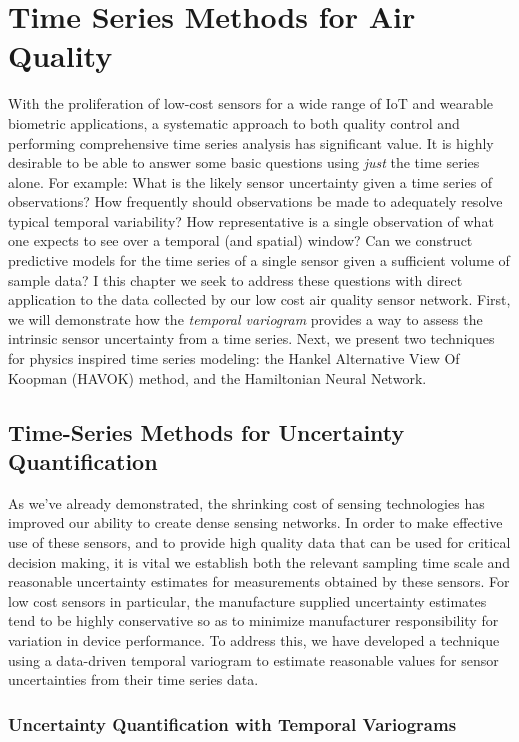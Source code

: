 \chapter{Time Series Methods for Air Quality}

With the proliferation of low-cost sensors for a wide range of IoT and wearable biometric applications, a systematic approach to both quality control and performing comprehensive time series analysis has significant value. It is highly desirable to be able to answer some basic questions using \textit{just} the time series alone. For example: What is the likely sensor uncertainty given a time series of observations? How frequently should observations be made to adequately resolve typical temporal variability? How representative is a single observation of what one expects to see over a temporal (and spatial) window? Can we construct predictive models for the time series of a single sensor given a sufficient volume of sample data? I this chapter we seek to address these questions with direct application to the data collected by our low cost air quality sensor network. First, we will demonstrate how the \textit{temporal variogram} provides a way to assess the intrinsic sensor uncertainty from a time series. Next, we present two techniques for physics inspired time series modeling: the Hankel Alternative View Of Koopman (HAVOK) method, and the Hamiltonian Neural Network.



\section{Time-Series Methods for Uncertainty Quantification}

As we've already demonstrated, the shrinking cost of sensing technologies has improved our ability to create dense sensing networks. In order to make effective use of these sensors, and to provide high quality data that can be used for critical decision making, it is vital we establish both the relevant sampling time scale and reasonable uncertainty estimates for measurements obtained by these sensors. For low cost sensors in particular, the manufacture supplied uncertainty estimates tend to be highly conservative so as to minimize manufacturer responsibility for variation in device performance. To address this, we have developed a technique using a data-driven temporal variogram to estimate reasonable values for sensor uncertainties from their time series data.

\subsection{Uncertainty Quantification with Temporal Variograms}


